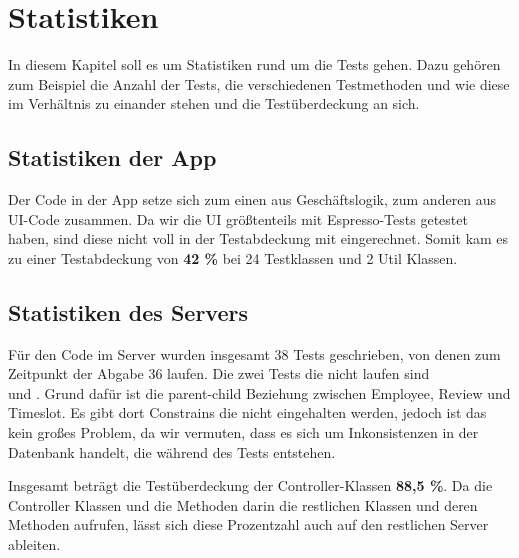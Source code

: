 
\section{Statistiken}

    In diesem Kapitel soll es um Statistiken rund um die Tests gehen. Dazu gehören zum Beispiel die Anzahl der Tests, die verschiedenen Testmethoden und wie diese im Verhältnis zu einander stehen und die Testüberdeckung an sich.

    \subsection{Statistiken der App}

        Der Code in der App setze sich zum einen aus Geschäftslogik, zum anderen aus UI-Code zusammen. Da wir die UI größtenteils mit Espresso-Tests getestet haben, sind diese nicht voll in der Testabdeckung mit eingerechnet. Somit kam es zu einer Testabdeckung von \textbf{42 \%} bei 24 Testklassen und 2 Util Klassen.

    \subsection{Statistiken des Servers}

        Für den Code im Server wurden insgesamt 38 Tests geschrieben, von denen zum Zeitpunkt der Abgabe 36 laufen.
        Die zwei Tests die nicht laufen sind\\  und . Grund dafür ist die parent-child Beziehung zwischen Employee, Review und Timeslot. Es gibt dort Constrains die nicht eingehalten werden, jedoch ist das kein großes Problem, da wir vermuten, dass es sich um Inkonsistenzen in der Datenbank handelt, die während des Tests entstehen.

        Insgesamt beträgt die Testüberdeckung der Controller-Klassen \textbf{88,5 \%}. Da die Controller Klassen und die Methoden darin die restlichen Klassen und deren Methoden aufrufen, lässt sich diese Prozentzahl auch auf den restlichen Server ableiten.
